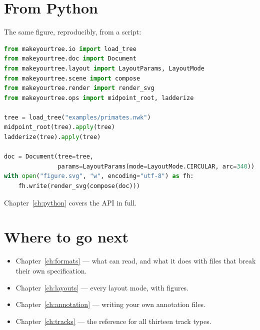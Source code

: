
\section{From Python}

The same figure, reproducibly, from a script:

\begin{lstlisting}[language=Python]
from makeyourtree.io import load_tree
from makeyourtree.doc import Document
from makeyourtree.layout import LayoutParams, LayoutMode
from makeyourtree.scene import compose
from makeyourtree.render import render_svg
from makeyourtree.ops import midpoint_root, ladderize

tree = load_tree("examples/primates.nwk")
midpoint_root(tree).apply(tree)
ladderize(tree).apply(tree)

doc = Document(tree=tree,
               params=LayoutParams(mode=LayoutMode.CIRCULAR, arc=340))
with open("figure.svg", "w", encoding="utf-8") as fh:
    fh.write(render_svg(compose(doc)))
\end{lstlisting}

Chapter~\ref{ch:python} covers the API in full.

\section{Where to go next}

\begin{itemize}
  \item Chapter~\ref{ch:formats} --- what \app{} can read, and what it does with
        files that break their own specification.
  \item Chapter~\ref{ch:layouts} --- every layout mode, with figures.
  \item Chapter~\ref{ch:annotation} --- writing your own annotation files.
  \item Chapter~\ref{ch:tracks} --- the reference for all thirteen track types.
\end{itemize}
